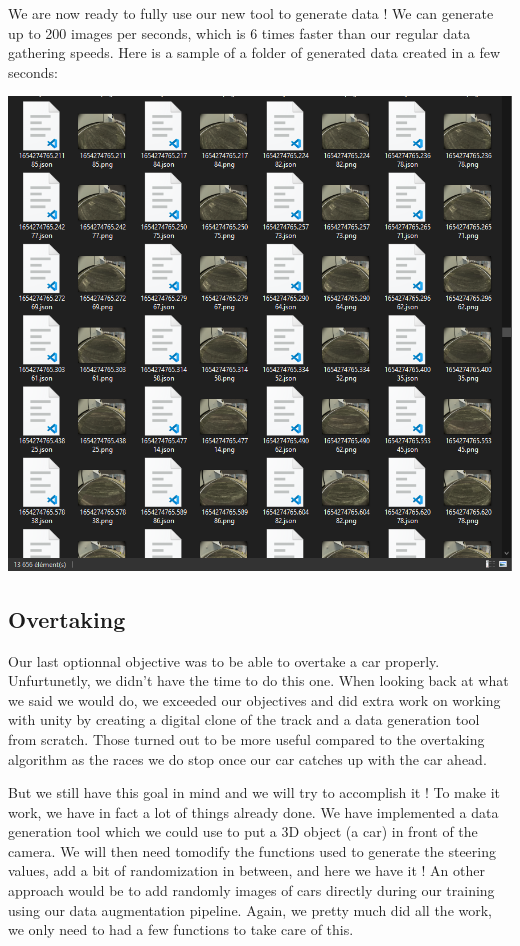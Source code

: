 \documentclass[12pt]{article}
\begin{document}
We are now ready to fully use our new tool to generate data !
We can generate up to 200 images per seconds, which is 6 times faster than our regular data gathering speeds.
Here is a sample of a folder of generated data created in a few seconds: \\
\centerline{\includegraphics[width=15cm]{../../docs/sim-folder.png}} 

\subsection{Overtaking}
Our last optionnal objective was to be able to overtake a car properly. Unfurtunetly, we didn't have the time to do this one. When looking back at what we said we would do, we exceeded our objectives and did extra work on working with unity by creating a digital clone of the track and a data generation tool from scratch. Those turned out to be more useful compared to the overtaking algorithm as the races we do stop once our car catches up with the car ahead.

But we still have this goal in mind and we will try to accomplish it ! To make it work, we have in fact a lot of things already done. We have implemented a data generation tool which we could use to put a 3D object (a car) in front of the camera. We will then need tomodify the functions used to generate the steering values, add a bit of randomization in between, and here we have it !
An other approach would be to add randomly images of cars directly during our training using our data augmentation pipeline. Again, we pretty much did all the work, we only need to had a few functions to take care of this.
\end{document}
